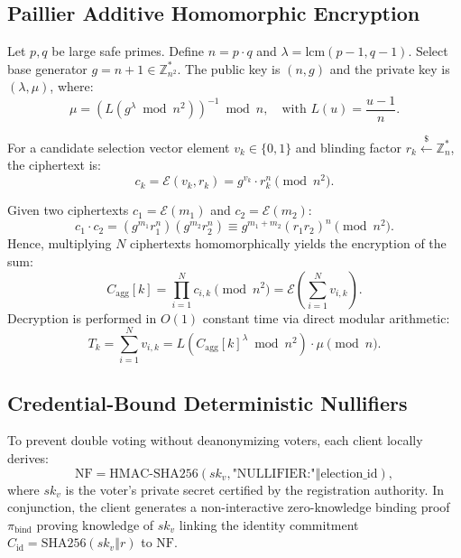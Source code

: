 \documentclass[journal,10pt,twocolumn]{IEEEtran}
\begin{document}
\subsection{Paillier Additive Homomorphic Encryption}
Let $p, q$ be large safe primes. Define $n = p \cdot q$ and $\lambda = \text{lcm}(p-1, q-1)$. Select base generator $g = n + 1 \in \mathbb{Z}_{n^2}^*$. The public key is $(n, g)$ and the private key is $(\lambda, \mu)$, where:
\begin{equation}
\mu = \left( L(g^\lambda \bmod n^2) \right)^{-1} \bmod n, \quad \text{with } L(u) = \frac{u-1}{n}.
\end{equation}

For a candidate selection vector element $v_k \in \{0, 1\}$ and blinding factor $r_k \xleftarrow{\$} \mathbb{Z}_n^*$, the ciphertext is:
\begin{equation}
c_k = \mathcal{E}(v_k, r_k) = g^{v_k} \cdot r_k^n \pmod{n^2}.
\end{equation}

Given two ciphertexts $c_1 = \mathcal{E}(m_1)$ and $c_2 = \mathcal{E}(m_2)$:
\begin{equation}
c_1 \cdot c_2 = (g^{m_1} r_1^n)(g^{m_2} r_2^n) \equiv g^{m_1 + m_2} (r_1 r_2)^n \pmod{n^2}.
\end{equation}
Hence, multiplying $N$ ciphertexts homomorphically yields the encryption of the sum:
\begin{equation}
C_{\text{agg}}[k] = \prod_{i=1}^N c_{i, k} \pmod{n^2} = \mathcal{E}\left(\sum_{i=1}^N v_{i, k}\right).
\end{equation}
Decryption is performed in $O(1)$ constant time via direct modular arithmetic:
\begin{equation}
T_k = \sum_{i=1}^N v_{i, k} = L\left( C_{\text{agg}}[k]^\lambda \bmod n^2 \right) \cdot \mu \pmod n.
\end{equation}

\subsection{Credential-Bound Deterministic Nullifiers}
To prevent double voting without deanonymizing voters, each client locally derives:
\begin{equation}
\text{NF} = \text{HMAC-SHA256}(sk_v, \text{"NULLIFIER:"} \mathbin{\Vert} \text{election\_id}),
\end{equation}
where $sk_v$ is the voter's private secret certified by the registration authority. In conjunction, the client generates a non-interactive zero-knowledge binding proof $\pi_{\text{bind}}$ proving knowledge of $sk_v$ linking the identity commitment $C_{\text{id}} = \text{SHA256}(sk_v \mathbin{\Vert} r)$ to $\text{NF}$.
\end{document}
